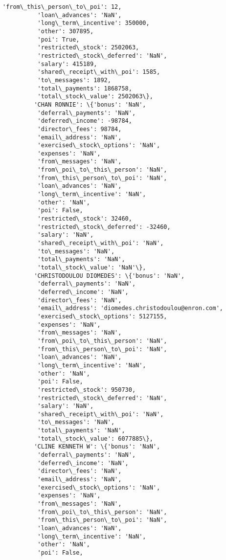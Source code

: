 \documentclass[11pt]{article}
\begin{document}
\begin{Verbatim}[commandchars=\\\{\}]
          'from\_this\_person\_to\_poi': 12,
          'loan\_advances': 'NaN',
          'long\_term\_incentive': 350000,
          'other': 307895,
          'poi': True,
          'restricted\_stock': 2502063,
          'restricted\_stock\_deferred': 'NaN',
          'salary': 415189,
          'shared\_receipt\_with\_poi': 1585,
          'to\_messages': 1892,
          'total\_payments': 1868758,
          'total\_stock\_value': 2502063\},
         'CHAN RONNIE': \{'bonus': 'NaN',
          'deferral\_payments': 'NaN',
          'deferred\_income': -98784,
          'director\_fees': 98784,
          'email\_address': 'NaN',
          'exercised\_stock\_options': 'NaN',
          'expenses': 'NaN',
          'from\_messages': 'NaN',
          'from\_poi\_to\_this\_person': 'NaN',
          'from\_this\_person\_to\_poi': 'NaN',
          'loan\_advances': 'NaN',
          'long\_term\_incentive': 'NaN',
          'other': 'NaN',
          'poi': False,
          'restricted\_stock': 32460,
          'restricted\_stock\_deferred': -32460,
          'salary': 'NaN',
          'shared\_receipt\_with\_poi': 'NaN',
          'to\_messages': 'NaN',
          'total\_payments': 'NaN',
          'total\_stock\_value': 'NaN'\},
         'CHRISTODOULOU DIOMEDES': \{'bonus': 'NaN',
          'deferral\_payments': 'NaN',
          'deferred\_income': 'NaN',
          'director\_fees': 'NaN',
          'email\_address': 'diomedes.christodoulou@enron.com',
          'exercised\_stock\_options': 5127155,
          'expenses': 'NaN',
          'from\_messages': 'NaN',
          'from\_poi\_to\_this\_person': 'NaN',
          'from\_this\_person\_to\_poi': 'NaN',
          'loan\_advances': 'NaN',
          'long\_term\_incentive': 'NaN',
          'other': 'NaN',
          'poi': False,
          'restricted\_stock': 950730,
          'restricted\_stock\_deferred': 'NaN',
          'salary': 'NaN',
          'shared\_receipt\_with\_poi': 'NaN',
          'to\_messages': 'NaN',
          'total\_payments': 'NaN',
          'total\_stock\_value': 6077885\},
         'CLINE KENNETH W': \{'bonus': 'NaN',
          'deferral\_payments': 'NaN',
          'deferred\_income': 'NaN',
          'director\_fees': 'NaN',
          'email\_address': 'NaN',
          'exercised\_stock\_options': 'NaN',
          'expenses': 'NaN',
          'from\_messages': 'NaN',
          'from\_poi\_to\_this\_person': 'NaN',
          'from\_this\_person\_to\_poi': 'NaN',
          'loan\_advances': 'NaN',
          'long\_term\_incentive': 'NaN',
          'other': 'NaN',
          'poi': False,

\end{Verbatim}
\end{document}
